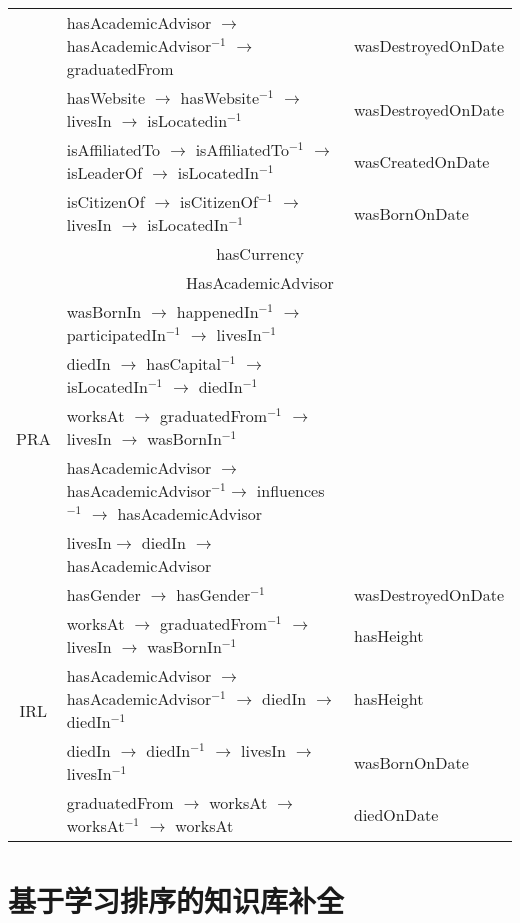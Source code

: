 \begin{table}[htbp]
\begin{tabular}{cp{12.6cm}|p{3.4cm}|}
          & hasAcademicAdvisor $\to$ hasAcademicAdvisor$^{-1}$ $\to$ graduatedFrom &wasDestroyedOnDate \\
          & hasWebsite $\to$ hasWebsite$^{-1}$ $\to$ livesIn $\to$ isLocatedin$^{-1}$ & wasDestroyedOnDate\\
          & isAffiliatedTo $\to$ isAffiliatedTo$^{-1}$ $\to$ isLeaderOf $\to$ isLocatedIn$^{-1}$ & wasCreatedOnDate \\
          & isCitizenOf $\to$ isCitizenOf$^{-1}$ $\to$ livesIn $\to$ isLocatedIn$^{-1}$ & wasBornOnDate \\
              \multicolumn{3}{c}{hasCurrency} \\
    \midrule
    \multicolumn{3}{c}{HasAcademicAdvisor} \\
    \midrule
    \multirow{5}[2]{*}{PRA} & wasBornIn $\to$ happenedIn$^{-1}$ $\to$ participatedIn$^{-1}$ $\to$ livesIn$^{-1}$ &  \\
          & diedIn $\to$ hasCapital$^{-1}$ $\to$ isLocatedIn$^{-1}$ $\to$ diedIn$^{-1}$ &  \\
          & worksAt $\to$ graduatedFrom$^{-1}$ $\to$ livesIn $\to$ wasBornIn$^{-1}$ &  \\
          & hasAcademicAdvisor $\to$ hasAcademicAdvisor$^{-1}$$\to$ influences$^{-1}$ $\to$ hasAcademicAdvisor &  \\
          & livesIn$\to$ diedIn $\to$ hasAcademicAdvisor &  \\
    \midrule
    \multirow{5}[2]{*}{IRL} & hasGender $\to$ hasGender$^{-1}$ & wasDestroyedOnDate \\
          & worksAt $\to$ graduatedFrom$^{-1}$ $\to$ livesIn $\to$ wasBornIn$^{-1}$ & hasHeight \\
          & hasAcademicAdvisor $\to$ hasAcademicAdvisor$^{-1}$ $\to$ diedIn $\to$ diedIn$^{-1}$ & hasHeight \\
          & diedIn $\to$ diedIn$^{-1}$ $\to$ livesIn $\to$ livesIn$^{-1}$ & wasBornOnDate \\
          & graduatedFrom $\to$ worksAt $\to$ worksAt$^{-1}$ $\to$ worksAt  & diedOnDate \\
    \midrule
    \bottomrule
    \end{tabular}%
  \label{tab:lit-rel-kbc}%
\end{table}%

\section{基于学习排序的知识库补全}
\label{cha:exp-relational}

